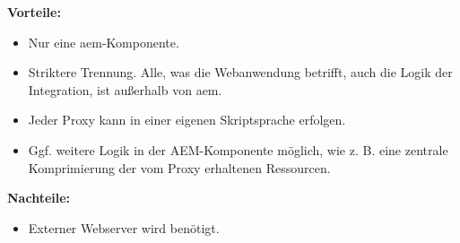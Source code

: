 \begin{minipage}[t]{0.5\textwidth}
	\textbf{Vorteile:}
	\begin{itemize}
		\item Nur eine \ac{aem}-Komponente.
		\item Striktere Trennung. Alle, was die Webanwendung betrifft, auch die Logik der Integration, ist außerhalb von \ac{aem}.
		\item Jeder Proxy kann in einer eigenen Skriptsprache erfolgen.
		\item Ggf. weitere Logik in der AEM-Komponente möglich, wie z. B. eine zentrale Komprimierung der vom Proxy erhaltenen Ressourcen.
	\end{itemize}
\end{minipage}
\begin{minipage}[t]{0.5\textwidth}
	\textbf{Nachteile:}
	\begin{itemize}
		\item Externer Webserver wird benötigt.
	\end{itemize}
\end{minipage}